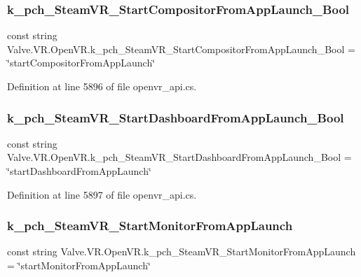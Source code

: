 \subsubsection{\texorpdfstring{k\_pch\_SteamVR\_StartCompositorFromAppLaunch\_Bool}{k\_pch\_SteamVR\_StartCompositorFromAppLaunch\_Bool}}
{\footnotesize\ttfamily const string Valve.\+V\+R.\+Open\+V\+R.\+k\+\_\+pch\+\_\+\+Steam\+V\+R\+\_\+\+Start\+Compositor\+From\+App\+Launch\+\_\+\+Bool = \char`\"{}start\+Compositor\+From\+App\+Launch\char`\"{}}



Definition at line 5896 of file openvr\+\_\+api.\+cs.

\mbox{\label{class_valve_1_1_v_r_1_1_open_v_r_a8dd7da75e051369b539bbd43e8223f1f}} 
\subsubsection{\texorpdfstring{k\_pch\_SteamVR\_StartDashboardFromAppLaunch\_Bool}{k\_pch\_SteamVR\_StartDashboardFromAppLaunch\_Bool}}
{\footnotesize\ttfamily const string Valve.\+V\+R.\+Open\+V\+R.\+k\+\_\+pch\+\_\+\+Steam\+V\+R\+\_\+\+Start\+Dashboard\+From\+App\+Launch\+\_\+\+Bool = \char`\"{}start\+Dashboard\+From\+App\+Launch\char`\"{}}



Definition at line 5897 of file openvr\+\_\+api.\+cs.

\mbox{\label{class_valve_1_1_v_r_1_1_open_v_r_a496fbeb3f7d3e19b1089787351865b64}} 
\subsubsection{\texorpdfstring{k\_pch\_SteamVR\_StartMonitorFromAppLaunch}{k\_pch\_SteamVR\_StartMonitorFromAppLaunch}}
{\footnotesize\ttfamily const string Valve.\+V\+R.\+Open\+V\+R.\+k\+\_\+pch\+\_\+\+Steam\+V\+R\+\_\+\+Start\+Monitor\+From\+App\+Launch = \char`\"{}start\+Monitor\+From\+App\+Launch\char`\"{}}



